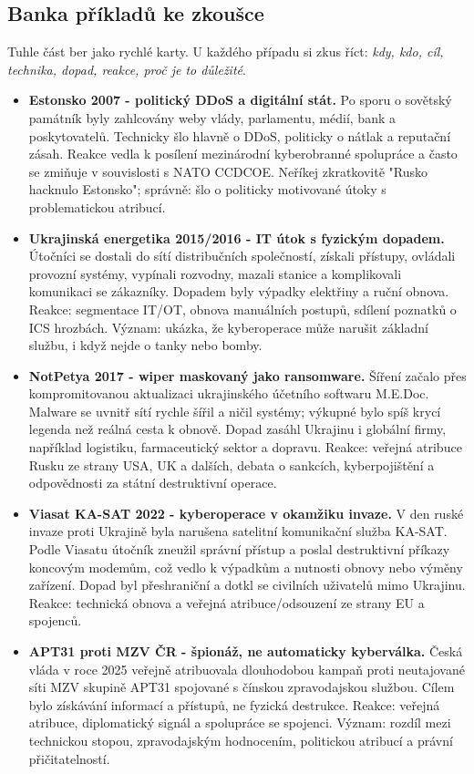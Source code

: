 \documentclass[11pt,a4paper]{article}
\begin{document}
\subsection*{Banka příkladů ke zkoušce}
Tuhle část ber jako rychlé karty. U každého případu si zkus říct: \emph{kdy, kdo, cíl, technika, dopad, reakce, proč je to důležité}.
\begin{itemize}
  \item \textbf{Estonsko 2007 - politický DDoS a digitální stát.} Po sporu o sovětský památník byly zahlcovány weby vlády, parlamentu, médií, bank a poskytovatelů. Technicky šlo hlavně o DDoS, politicky o nátlak a reputační zásah. Reakce vedla k posílení mezinárodní kyberobranné spolupráce a často se zmiňuje v souvislosti s NATO CCDCOE. Neříkej zkratkovitě "Rusko hacknulo Estonsko"; správně: šlo o politicky motivované útoky s problematickou atribucí.
  \item \textbf{Ukrajinská energetika 2015/2016 - IT útok s fyzickým dopadem.} Útočníci se dostali do sítí distribučních společností, získali přístupy, ovládali provozní systémy, vypínali rozvodny, mazali stanice a komplikovali komunikaci se zákazníky. Dopadem byly výpadky elektřiny a ruční obnova. Reakce: segmentace IT/OT, obnova manuálních postupů, sdílení poznatků o ICS hrozbách. Význam: ukázka, že kyberoperace může narušit základní službu, i když nejde o tanky nebo bomby.
  \item \textbf{NotPetya 2017 - wiper maskovaný jako ransomware.} Šíření začalo přes kompromitovanou aktualizaci ukrajinského účetního softwaru M.E.Doc. Malware se uvnitř sítí rychle šířil a ničil systémy; výkupné bylo spíš krycí legenda než reálná cesta k obnově. Dopad zasáhl Ukrajinu i globální firmy, například logistiku, farmaceutický sektor a dopravu. Reakce: veřejná atribuce Rusku ze strany USA, UK a dalších, debata o sankcích, kyberpojištění a odpovědnosti za státní destruktivní operace.
  \item \textbf{Viasat KA-SAT 2022 - kyberoperace v okamžiku invaze.} V den ruské invaze proti Ukrajině byla narušena satelitní komunikační služba KA-SAT. Podle Viasatu útočník zneužil správní přístup a poslal destruktivní příkazy koncovým modemům, což vedlo k výpadkům a nutnosti obnovy nebo výměny zařízení. Dopad byl přeshraniční a dotkl se civilních uživatelů mimo Ukrajinu. Reakce: technická obnova a veřejná atribuce/odsouzení ze strany EU a spojenců.
  \item \textbf{APT31 proti MZV ČR - špionáž, ne automaticky kyberválka.} Česká vláda v roce 2025 veřejně atribuovala dlouhodobou kampaň proti neutajované síti MZV skupině APT31 spojované s čínskou zpravodajskou službou. Cílem bylo získávání informací a přístupů, ne fyzická destrukce. Reakce: veřejná atribuce, diplomatický signál a spolupráce se spojenci. Význam: rozdíl mezi technickou stopou, zpravodajským hodnocením, politickou atribucí a právní přičitatelností.

\end{itemize}
\end{document}
